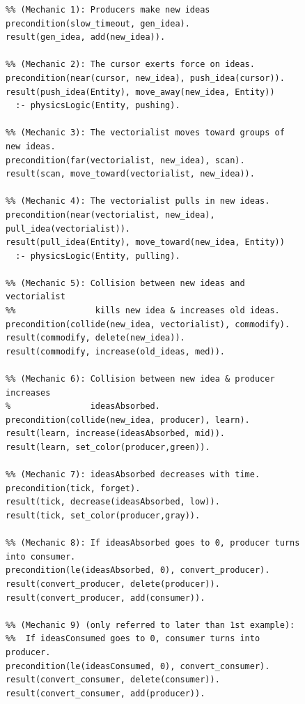 \documentclass[a4paper]{article}
\begin{document}
\begin{figure}

%
%

\begin{verbatim}
%% (Mechanic 1): Producers make new ideas
precondition(slow_timeout, gen_idea).
result(gen_idea, add(new_idea)).

%% (Mechanic 2): The cursor exerts force on ideas.
precondition(near(cursor, new_idea), push_idea(cursor)).
result(push_idea(Entity), move_away(new_idea, Entity))
  :- physicsLogic(Entity, pushing).

%% (Mechanic 3): The vectorialist moves toward groups of new ideas.
precondition(far(vectorialist, new_idea), scan).
result(scan, move_toward(vectorialist, new_idea)).

%% (Mechanic 4): The vectorialist pulls in new ideas.
precondition(near(vectorialist, new_idea), pull_idea(vectorialist)).
result(pull_idea(Entity), move_toward(new_idea, Entity))
  :- physicsLogic(Entity, pulling).

%% (Mechanic 5): Collision between new ideas and vectorialist
%%                kills new idea & increases old ideas.
precondition(collide(new_idea, vectorialist), commodify).
result(commodify, delete(new_idea)).
result(commodify, increase(old_ideas, med)).

%% (Mechanic 6): Collision between new idea & producer increases
%                ideasAbsorbed.
precondition(collide(new_idea, producer), learn).
result(learn, increase(ideasAbsorbed, mid)).
result(learn, set_color(producer,green)).

%% (Mechanic 7): ideasAbsorbed decreases with time.
precondition(tick, forget).
result(tick, decrease(ideasAbsorbed, low)).
result(tick, set_color(producer,gray)).

%% (Mechanic 8): If ideasAbsorbed goes to 0, producer turns into consumer.
precondition(le(ideasAbsorbed, 0), convert_producer).
result(convert_producer, delete(producer)).
result(convert_producer, add(consumer)).

%% (Mechanic 9) (only referred to later than 1st example):
%%  If ideasConsumed goes to 0, consumer turns into producer.
precondition(le(ideasConsumed, 0), convert_consumer).
result(convert_consumer, delete(consumer)).
result(convert_consumer, add(producer)).


\end{verbatim}
\end{figure}
\end{document}
